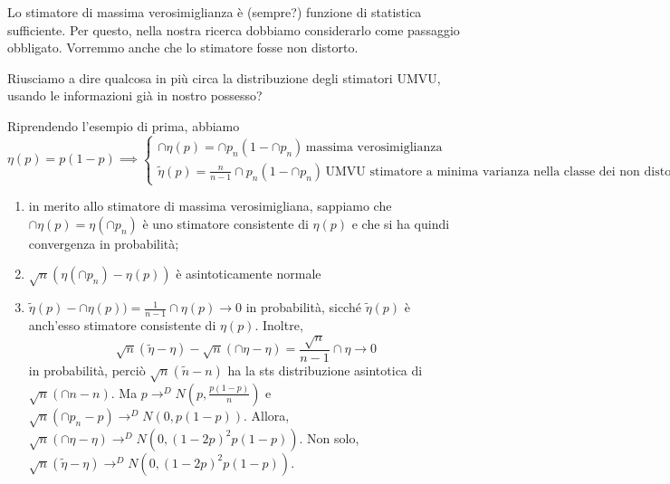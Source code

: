 Lo stimatore di massima verosimiglianza è (sempre?) funzione di statistica sufficiente. Per questo, nella nostra ricerca dobbiamo considerarlo come passaggio obbligato. Vorremmo anche che lo stimatore fosse non distorto.

Riusciamo a dire qualcosa in più circa la distribuzione degli stimatori UMVU, usando le informazioni già in nostro possesso?

Riprendendo l'esempio di prima, abbiamo
\begin{equation*}
  \eta(p) = p(1-p) \implies
  \begin{cases}
    \cap{\eta}(p) = \cap{p}_n(1-\cap{p}_n)\, \text{massima verosimiglianza} \\
    \tilde{\eta}(p) = \frac{n}{n-1} \cap{p}_n(1-\cap{p}_n) \,\text{UMVU stimatore a minima varianza nella classe dei non distorti}
  \end{cases}
\end{equation*}
\begin{enumerate}
  \item in merito allo stimatore di massima verosimigliana, sappiamo che \(\cap{\eta}(p) = \eta(\cap{p}_n)\) è uno stimatore consistente di \(\eta(p)\) e che si ha quindi convergenza in probabilità;
  \item \(\sqrt{n}(\eta(\cap{p}_n) - \eta(p))\) è asintoticamente normale
  \item \(\tilde{\eta}(p) - \cap{\eta}(p)) = \frac{1}{n-1}\cap{\eta}(p) \to 0\) in probabilità, sicché \(\tilde{\eta}(p)\) è anch'esso stimatore consistente di \(\eta(p)\). Inoltre,
  \begin{equation*}
    \sqrt{n}(\tilde{\eta} - \eta) - \sqrt{n}(\cap{\eta} - \eta) =
    \frac{\sqrt{n}}{n-1}\cap{\eta} \to 0
  \end{equation*}
  in probabilità, perciò \(\sqrt{n}(\tilde{n}-n)\) ha la sts distribuzione asintotica di \(\sqrt{n}(\cap{n}-n)\).
  Ma \(p \to^D N(p, \frac{p(1-p)}{n})\) e
  \(\sqrt{n}(\cap{p}_n-p) \to^D N(0,p(1-p))\).
  Allora, \(\sqrt{n}(\cap{\eta}-\eta) \to^D N(0,(1-2p)^2p(1-p)).\)
  Non solo, \(\sqrt{n}(\tilde{\eta}-\eta)\to^D N(0,(1-2p)^2p(1-p))\).
\end{enumerate}

